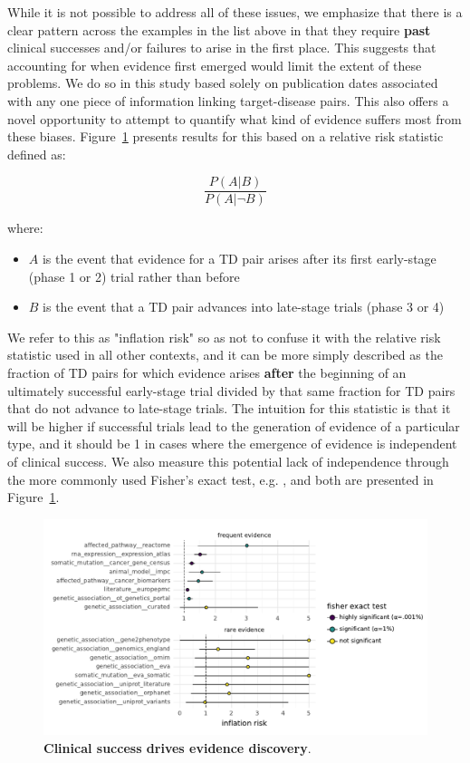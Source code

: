 \documentclass{article}
\begin{document}
While it is not possible to address all of these issues, we emphasize that there is a clear pattern across the examples in the list above in that they require \textbf{past} clinical successes and/or failures to arise in the first place. This suggests that accounting for when evidence first emerged would limit the extent of these problems. We do so in this study based solely on publication dates associated with any one piece of information linking target-disease pairs. This also offers a novel opportunity to attempt to quantify what kind of evidence suffers most from these biases. Figure~\ref{fig:evidence_inflation} presents results for this based on a relative risk statistic defined as:

\begin{equation}
  \frac{P(A | B)}{P(A | \neg B)}
\end{equation}

where:

\begin{itemize}
\item \(A\) is the event that evidence for a TD pair arises after its first early-stage (phase 1 or 2) trial rather than before
\item \(B\) is the event that a TD pair advances into late-stage trials (phase 3 or 4)
\end{itemize}

We refer to this as "inflation risk" so as not to confuse it with the relative risk statistic used in all other contexts, and it can be more simply described as the fraction of TD pairs for which evidence arises \textbf{after} the beginning of an ultimately successful early-stage trial divided by that same fraction for TD pairs that do not advance to late-stage trials. The intuition for this statistic is that it will be higher if successful trials lead to the generation of evidence of a particular type, and it should be 1 in cases where the emergence of evidence is independent of clinical success. We also measure this potential lack of independence through the more commonly used Fisher's exact test, e.g. \cite{PMID:19725948}, and both are presented in Figure~\ref{fig:evidence_inflation}.

\begin{figure}[!htb]
  \centering
  \captionsetup{width=.9\linewidth}
  \includegraphics[width=1\textwidth]{evidence_inflation.pdf}
  \caption{
    \textbf{Clinical success drives evidence discovery}.  
  }
  \label{fig:evidence_inflation}
\end{figure}
\end{document}
